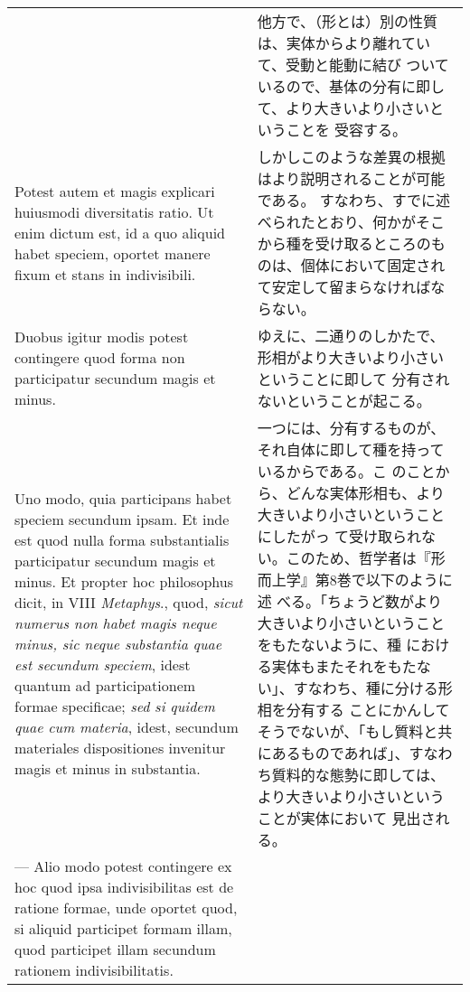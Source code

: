 \documentclass[10pt]{jsarticle} %
\begin{document}
\begin{longtable}{p{21em}p{21em}}
&

他方で、（形とは）別の性質は、実体からより離れていて、受動と能動に結び
 ついているので、基体の分有に即して、より大きいより小さいということを
 受容する。

\\


Potest autem et magis explicari huiusmodi diversitatis
ratio. Ut enim dictum est, id a quo aliquid habet speciem, oportet
manere fixum et stans in indivisibili. 


&

しかしこのような差異の根拠はより説明されることが可能である。
すなわち、すでに述べられたとおり、何かがそこから種を受け取るところのも
のは、個体において固定されて安定して留まらなければならない。

\\


Duobus igitur modis potest
contingere quod forma non participatur secundum magis et minus. 




&

ゆえに、二通りのしかたで、形相がより大きいより小さいということに即して
分有されないということが起こる。

\\

Uno modo, quia participans habet speciem secundum ipsam.  Et inde est
quod nulla forma substantialis participatur secundum magis et
minus. Et propter hoc philosophus dicit, in VIII {\itshape Metaphys}.,
quod, {\itshape sicut numerus non habet magis neque minus, sic neque
substantia quae est secundum speciem}, idest quantum ad
participationem formae specificae; {\itshape sed si quidem quae cum
materia}, idest, secundum materiales dispositiones invenitur magis et
minus in substantia.


&

一つには、分有するものが、それ自体に即して種を持っているからである。こ
のことから、どんな実体形相も、より大きいより小さいということにしたがっ
て受け取られない。このため、哲学者は『形而上学』第8巻で以下のように述
べる。「ちょうど数がより大きいより小さいということをもたないように、種
における実体もまたそれをもたない」、すなわち、種に分ける形相を分有する
ことにかんしてそうでないが、「もし質料と共にあるものであれば」、すなわ
ち質料的な態勢に即しては、より大きいより小さいということが実体において
見出される。

\\


--- Alio modo potest contingere ex
hoc quod ipsa indivisibilitas est de ratione formae, unde oportet
quod, si aliquid participet formam illam, quod participet illam
secundum rationem indivisibilitatis. 



\end{longtable}
\end{document}
